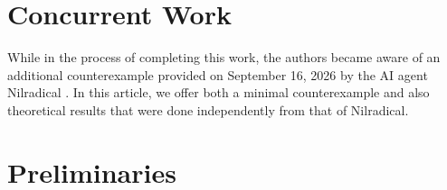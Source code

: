 \documentclass[11pt]{article}
\theoremstyle{definition}
\numberwithin{equation}{section}
\begin{document}
\section*{Concurrent Work}
\begin{humanblock}
While in the process of completing this work, the authors became aware of an additional counterexample provided on September 16, 2026 by the AI agent Nilradical \cite{nilradical_v0_kourovka_21_68}. In this article, we offer both a minimal counterexample and also theoretical results that were done  independently from that of Nilradical. 
\end{humanblock}



\section{Preliminaries}
\end{document}
